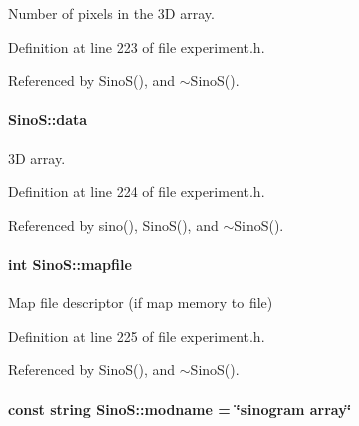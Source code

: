 Number of pixels in the 3D array. 



Definition at line 223 of file experiment.h.



Referenced by SinoS(), and $\sim$SinoS().

\hypertarget{classSinoS_a3dd5dabaa38f646efc6289bb4caca6c4}{
\paragraph[{data}]{ {\bf SinoS::data}}\hfill}
\label{classSinoS_a3dd5dabaa38f646efc6289bb4caca6c4}


3D array. 



Definition at line 224 of file experiment.h.



Referenced by sino(), SinoS(), and $\sim$SinoS().

\hypertarget{classSinoS_acd76bc4567a80d9fcd66e936a35a9a17}{
\paragraph[{mapfile}]{\setlength{\rightskip}{0pt plus 5cm}int {\bf SinoS::mapfile}}\hfill}
\label{classSinoS_acd76bc4567a80d9fcd66e936a35a9a17}


Map file descriptor (if map memory to file) 



Definition at line 225 of file experiment.h.



Referenced by SinoS(), and $\sim$SinoS().

\hypertarget{classSinoS_a3e55eb24bed80d8217b5afb9df13bc83}{
\paragraph[{modname}]{\setlength{\rightskip}{0pt plus 5cm}const string {\bf SinoS::modname} = \char`\"{}sinogram array\char`\"{}}\hfill}
\label{classSinoS_a3e55eb24bed80d8217b5afb9df13bc83}


